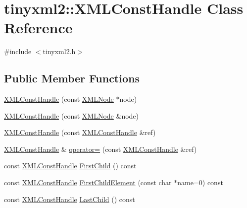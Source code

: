 \hypertarget{classtinyxml2_1_1_x_m_l_const_handle}{}\section{tinyxml2\+:\+:X\+M\+L\+Const\+Handle Class Reference}
\label{classtinyxml2_1_1_x_m_l_const_handle}


{\ttfamily \#include $<$tinyxml2.\+h$>$}

\subsection*{Public Member Functions}
\begin{DoxyCompactItemize}
\item 
\mbox{\hyperlink{classtinyxml2_1_1_x_m_l_const_handle_a098bda71fa11d7c74ccddab59d5dd534}{X\+M\+L\+Const\+Handle}} (const \mbox{\hyperlink{classtinyxml2_1_1_x_m_l_node}{X\+M\+L\+Node}} $\ast$node)
\item 
\mbox{\hyperlink{classtinyxml2_1_1_x_m_l_const_handle_a8420a0c4720637e0529e78c2e22f2b0b}{X\+M\+L\+Const\+Handle}} (const \mbox{\hyperlink{classtinyxml2_1_1_x_m_l_node}{X\+M\+L\+Node}} \&node)
\item 
\mbox{\hyperlink{classtinyxml2_1_1_x_m_l_const_handle_a639317ad315ff24f4ef0dc69312d7303}{X\+M\+L\+Const\+Handle}} (const \mbox{\hyperlink{classtinyxml2_1_1_x_m_l_const_handle}{X\+M\+L\+Const\+Handle}} \&ref)
\item 
\mbox{\hyperlink{classtinyxml2_1_1_x_m_l_const_handle}{X\+M\+L\+Const\+Handle}} \& \mbox{\hyperlink{classtinyxml2_1_1_x_m_l_const_handle_a2d74c91df1ff9aa5f9b57e3dceddbf94}{operator=}} (const \mbox{\hyperlink{classtinyxml2_1_1_x_m_l_const_handle}{X\+M\+L\+Const\+Handle}} \&ref)
\item 
const \mbox{\hyperlink{classtinyxml2_1_1_x_m_l_const_handle}{X\+M\+L\+Const\+Handle}} \mbox{\hyperlink{classtinyxml2_1_1_x_m_l_const_handle_aef06bd16cb308652a32b864b0a743136}{First\+Child}} () const
\item 
const \mbox{\hyperlink{classtinyxml2_1_1_x_m_l_const_handle}{X\+M\+L\+Const\+Handle}} \mbox{\hyperlink{classtinyxml2_1_1_x_m_l_const_handle_ac747db472ffc55c5af2e82ffec813640}{First\+Child\+Element}} (const char $\ast$name=0) const
\item 
const \mbox{\hyperlink{classtinyxml2_1_1_x_m_l_const_handle}{X\+M\+L\+Const\+Handle}} \mbox{\hyperlink{classtinyxml2_1_1_x_m_l_const_handle_a908436124990f3d7b35cb7df20d31d9e}{Last\+Child}} () const

\end{DoxyCompactItemize}
